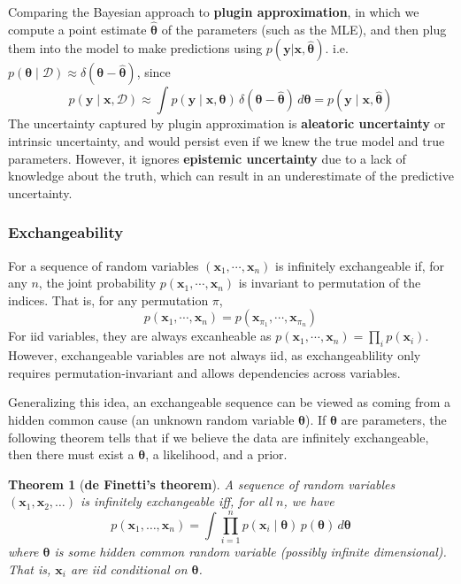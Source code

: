 \documentclass[11pt]{article}
\newtheorem{theorem}{Theorem}
\begin{document}
Comparing the Bayesian approach to \textbf{plugin approximation}, in which we compute a point estimate $\hat{\boldsymbol{\theta}}$ of the parameters (such as the MLE), and then plug them into the model to make predictions using $p(\boldsymbol{y} | \boldsymbol{x}, \hat{\boldsymbol{\theta}})$.
i.e. $p(\boldsymbol{\theta} \mid \mathcal{D}) \approx \delta(\boldsymbol{\theta} - \hat{\boldsymbol{\theta}})$, since
\[
p(\boldsymbol{y} \mid \boldsymbol{x}, \mathcal{D}) \approx \int p(\boldsymbol{y} \mid \boldsymbol{x}, \boldsymbol{\theta})\, \delta(\boldsymbol{\theta} - \hat{\boldsymbol{\theta}})\, d\boldsymbol{\theta} = p(\boldsymbol{y} \mid \boldsymbol{x}, \hat{\boldsymbol{\theta}})
\]
The uncertainty captured by plugin approximation is \textbf{aleatoric uncertainty} or intrinsic uncertainty, and would persist even if we knew the true model and true parameters. 
However, it ignores \textbf{epistemic uncertainty} due to a lack of knowledge about the truth, which can result in an underestimate of the predictive uncertainty.

\subsubsection*{Exchangeability}
For a sequence of random variables $(\boldsymbol{x}_1, \cdots, \boldsymbol{x}_n)$ is infinitely exchangeable if, for any $n$, the joint probability $p(\boldsymbol{x}_1, \cdots, \boldsymbol{x}_n)$ is invariant to permutation of the indices. That is, for any permutation $\pi$,
\[
p(\boldsymbol{x}_1, \cdots, \boldsymbol{x}_n) = p(\boldsymbol{x}_{\pi_1}, \cdots, \boldsymbol{x}_{\pi_n})
\]
For iid variables, they are always excanheable as $p(\boldsymbol{x}_1, \cdots, \boldsymbol{x}_n) = \prod_i p(\boldsymbol{x}_i)$.
However, exchangeable variables are not always iid, as exchangeablility only requires permutation-invariant and allows dependencies across variables.

Generalizing this idea, an exchangeable sequence can be viewed as coming from a hidden common cause (an unknown random variable $\boldsymbol{\theta}$).
If $\boldsymbol{\theta}$ are parameters, the following theorem tells that if we believe the data are infinitely exchangeable, 
then there must exist a $\boldsymbol{\theta}$, a likelihood, and a prior.
\begin{theorem}[\textbf{de Finetti's theorem}]
A sequence of random variables $(\boldsymbol{x}_1, \boldsymbol{x}_2, \ldots)$ is infinitely exchangeable iff, for all $n$, we have
\[
p(\boldsymbol{x}_1, \ldots, \boldsymbol{x}_n) = \int \prod_{i=1}^{n} p(\boldsymbol{x}_i \mid \boldsymbol{\theta})\, p(\boldsymbol{\theta})\, d\boldsymbol{\theta}
\]
where $\boldsymbol{\theta}$ is some hidden common random variable (possibly infinite dimensional). That is, $\boldsymbol{x}_i$ are iid conditional on $\boldsymbol{\theta}$.
\end{theorem}
\end{document}
